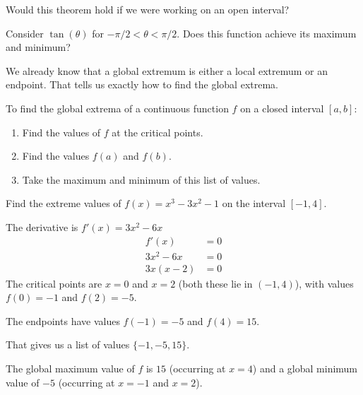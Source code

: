 \documentclass{ximera}
\begin{document}
\begin{question}
  Would this theorem hold if we were working on an open interval?
  \begin{multipleChoice}
  \end{multipleChoice}
  \begin{hint}
    Consider $\tan(\theta)$ for $-\pi/2 < \theta < \pi/2$. Does this function achieve its maximum and minimum? 
  \end{hint}
\end{question}

We already know that a global extremum is either a local extremum or an endpoint. 
That tells us exactly how to find the global extrema.
\begin{procedure}\label{proc:cim}
	To find the global extrema of a continuous function $f$ on a 
	closed interval $[a,b]$:  
	\begin{enumerate}
		\item Find the values of $f$ at the critical points.
		\item Find the values $f(a)$ and $f(b)$.
		\item Take the maximum and minimum of this list of values.
	\end{enumerate}
\end{procedure}

\begin{example}
	Find the extreme values of $f(x) = x^3 - 3x^2 - 1$ on the interval $[-1,4]$.
	\begin{explanation}
		The derivative is $f'(x) = 3x^2 - 6x$  
			\begin{align*}
				f'(x) &= 0\\
				3x^2 - 6x &= 0\\
				3x(x-2) &= 0
			\end{align*}
			The critical points are $x=0$ and $x=2$ (both these lie in $(-1,4)$), 
			with values $f(0) = -1$ and  $f(2) = -5$.
			
			The endpoints have values $f(-1) = -5$ and $f(4) = 15$.
			
			That gives us a list of values $\{ -1, -5, 15\}$.
			
			The global maximum value of $f$ is $15$ (occurring at $x=4$) and a 
			global minimum value of $-5$ (occurring at $x=-1$ and $x=2$).
	\end{explanation}
\end{example}
\end{document}
